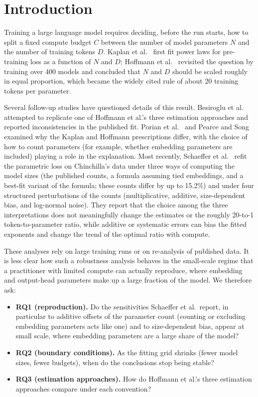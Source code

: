 \section{Introduction}
\label{sec:intro}

Training a large language model requires deciding, before the run starts, how to split a fixed compute budget $C$ between the number of model parameters $N$ and the number of training tokens $D$. Kaplan et al.~\citep{kaplan2020} first fit power laws for pre-training loss as a function of $N$ and $D$; Hoffmann et al.~\citep{hoffmann2022} revisited the question by training over 400 models and concluded that $N$ and $D$ should be scaled roughly in equal proportion, which became the widely cited rule of about 20 training tokens per parameter.

Several follow-up studies have questioned details of this result. Besiroglu et al.~\citep{besiroglu2024} attempted to replicate one of Hoffmann et al.'s three estimation approaches and reported inconsistencies in the published fit. Porian et al.~\citep{porian2024} and Pearce and Song~\citep{pearce2024} examined why the Kaplan and Hoffmann prescriptions differ, with the choice of how to count parameters (for example, whether embedding parameters are included) playing a role in the explanation. Most recently, Schaeffer et al.~\citep{schaeffer2025} refit the parametric loss on Chinchilla's data under three ways of computing the model sizes (the published counts, a formula assuming tied embeddings, and a best-fit variant of the formula; these counts differ by up to 15.2\%) and under four structured perturbations of the counts (multiplicative, additive, size-dependent bias, and log-normal noise). They report that the choice among the three interpretations does not meaningfully change the estimates or the roughly 20-to-1 token-to-parameter ratio, while additive or systematic errors can bias the fitted exponents and change the trend of the optimal ratio with compute.

These analyses rely on large training runs or on re-analysis of published data. It is less clear how such a robustness analysis behaves in the small-scale regime that a practitioner with limited compute can actually reproduce, where embedding and output-head parameters make up a large fraction of the model. We therefore ask:
\begin{itemize}
  \item \textbf{RQ1 (reproduction).} Do the sensitivities Schaeffer et al.\ report, in particular to additive offsets of the parameter count (counting or excluding embedding parameters acts like one) and to size-dependent bias, appear at small scale, where embedding parameters are a large share of the model?
  \item \textbf{RQ2 (boundary conditions).} As the fitting grid shrinks (fewer model sizes, fewer budgets), when do the conclusions stop being stable?
  \item \textbf{RQ3 (estimation approaches).} How do Hoffmann et al.'s three estimation approaches compare under each convention?
\end{itemize}

